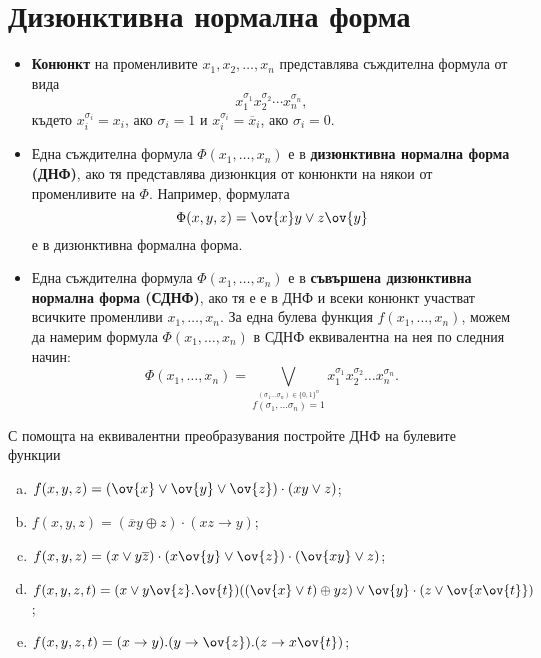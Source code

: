 \section{Дизюнктивна нормална форма}

\begin{itemize}
\item
  {\bf Конюнкт} на променливите $x_1,x_2,\dots,x_n$ представлява съждителна формула от вида 
  \[x^{\sigma_1}_1x^{\sigma_2}_2 \cdots x^{\sigma_n}_n,\]
  където $x^{\sigma_i}_i = x_i$, ако $\sigma_i = 1$ и $x^{\sigma_i}_i = \overline{x}_i$, ако $\sigma_i = 0$.
\item
  Една съждителна формула $\Phi(x_1,\dots,x_n)$ е в {\bf дизюнктивна нормална форма (ДНФ)}, ако
  тя представлява дизюнкция от конюнкти на някои от променливите на $\Phi$.
  Например, формулата 
  \[\Phi(x,y,z) = \ov{x}y \vee z\ov{y}\]
  е в дизюнктивна формална форма.
\item
  Една съждителна формула $\Phi(x_1,\dots,x_n)$ е в {\bf съвършена дизюнктивна нормална форма (СДНФ)}, ако
  тя е е в ДНФ и всеки конюнкт участват всичките променливи $x_1,\dots,x_n$.
  За една булева функция $f(x_1,\dots,x_n)$, можем да намерим формула $\Phi(x_1,\dots,x_n)$ в СДНФ еквивалентна на нея по следния начин:
  \[\Phi(x_1,\dots,x_n) = \bigvee_{\stackrel{(\sigma_1\dots \sigma_n) \in \{0,1\}^n}{f(\sigma_1, \dots \sigma_n) = 1}}x_1^{\sigma_1}x_2^{\sigma_2}\dots x_n^{\sigma_n}.\]
\end{itemize}

\begin{problem}
  С помощта на еквивалентни преобразувания постройте ДНФ на булевите функции
  \begin{enumerate}[a)]
  \item
    $f(x,y,z) = (\ov{x}\vee\ov{y}\vee\ov{z})\cdot(xy\vee z)$;
  \item
    $f(x,y,z) = (\overline{x}y\oplus z)\cdot(xz\rightarrow y)$;
  \item
    $f(x,y,z) = (x\vee y\overline{z})\cdot(x\ov{y}\vee\ov{z})\cdot(\ov{xy}\vee z)$;
  \item
    $f(x,y,z,t) = (x\vee y\ov{z}.\ov{t})((\ov{x}\vee t)\oplus yz)\vee \ov{y}\cdot(z\vee \ov{x\ov{t}})$;
  \item
    $f(x,y,z,t) = (x\rightarrow y).(y\rightarrow \ov{z}).(z\rightarrow x\ov{t})$;
  \end{enumerate}
\end{problem}

